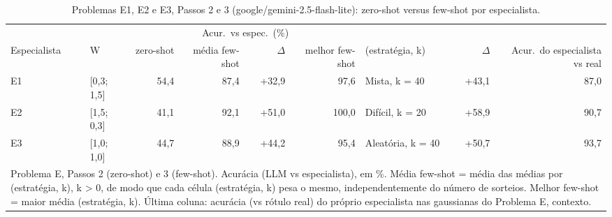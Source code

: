 \begin{table}[htbp]
\centering
\small
\caption{Problemas E1, E2 e E3, Passos 2 e 3 (google/gemini-2.5-flash-lite): zero-shot versus few-shot por especialista.}
\label{tab:bloco2_E_passo2_vs_passo3_flashlite}
\begin{tabular}{llrrrrlrr}
\toprule
 &  & \multicolumn{4}{c}{Acur.\ vs espec.\ (\%)} &  &  &  \\ \cmidrule(lr){3-6}
Especialista & W & zero-shot & média few-shot & $\Delta$ & melhor few-shot & (estratégia, k) & $\Delta$ & Acur.\ do especialista vs real \\
\midrule
E1 & [0,3; 1,5] & 54,4 & 87,4 & +32,9 & 97,6 & Mista, k = 40 & +43,1 & 87,0 \\
E2 & [1,5; 0,3] & 41,1 & 92,1 & +51,0 & 100,0 & Difícil, k = 20 & +58,9 & 90,7 \\
E3 & [1,0; 1,0] & 44,7 & 88,9 & +44,2 & 95,4 & Aleatória, k = 40 & +50,7 & 93,7 \\
\bottomrule
\multicolumn{9}{p{0.95\linewidth}}{\footnotesize Problema E, Passos 2 (zero-shot) e 3 (few-shot). Acurácia (LLM vs especialista), em \%. Média few-shot = média das médias por (estratégia, k), k > 0, de modo que cada célula (estratégia, k) pesa o mesmo, independentemente do número de sorteios. Melhor few-shot = maior média (estratégia, k). Última coluna: acurácia (vs rótulo real) do próprio especialista nas gaussianas do Problema E, contexto.} \\
\end{tabular}
\end{table}
